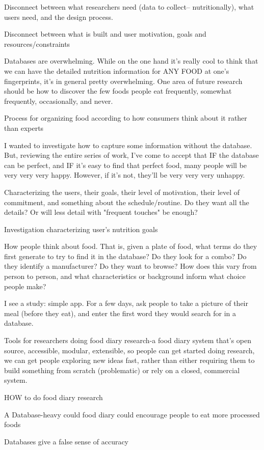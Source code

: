 \begin{itemize*}
\item Disconnect between what researchers need (data to collect-- nutritionally), what users need, and the design process. 
\item Disconnect between what is built and user motivation, goals and resources/constraints 
\item Databases are overwhelming. While on the one hand it's really cool to think that we can have the detailed nutrition information for ANY FOOD at one's fingerprints, it's in general pretty overwhelming. One area of future research should be how to discover the few foods people eat frequently, somewhat frequently, occasionally, and never. 
\item Process for organizing food according to how consumers think about it rather than experts
\item I wanted to investigate how to capture some information without the database. But, reviewing the entire series of work, I've come to accept that IF the database can be perfect, and IF it's easy to find that perfect food, many people will be very very very happy. However, if it's not, they'll be very very very unhappy.  
\item Characterizing the users, their goals, their level of motivation, their level of commitment, and something about the schedule/routine. Do they want all the details? Or will less detail with "frequent touches" be enough? 
\item Investigation characterizing user's nutrition goals
\item How people think about food. That is, given a plate of food, what terms do they first generate to try to find it in the database? Do they look for a combo? Do they identify a manufacturer? Do they want to browse? How does this vary from person to person, and what characteristics or background inform what choice people make? 
\item I see a study: simple app. For a few days, ask people to take a picture of their meal (before they eat), and enter the first word they would search for in a database. 
\item Tools for researchers doing food diary research-a food diary system that's open source, accessible, modular, extensible, so people can get started doing research, we can get people exploring new ideas fast, rather than either requiring them to build something from scratch (problematic) or rely on a closed, commercial system. 
\item HOW to do food diary research
\item A Database-heavy could food diary could encourage people to eat more processed foods
\item Databases give a false sense of accuracy

\end{itemize*}
